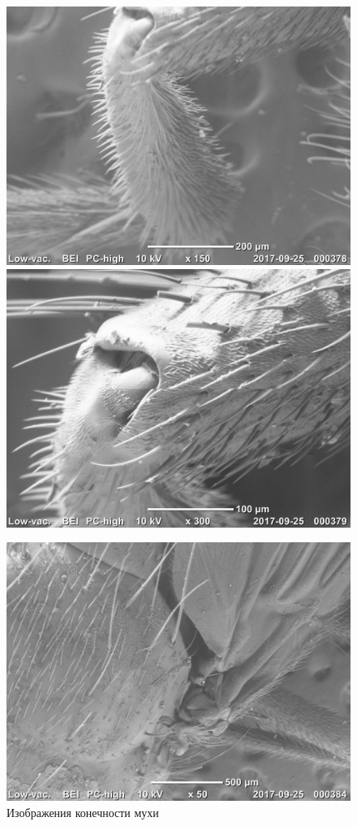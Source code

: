 \documentclass[12pt]{article}
\begin{document}
\begin{figure}
	\includegraphics[scale=0.65]{pictures/20170925_000378.jpg}
	\includegraphics[scale=0.65]{pictures/20170925_000379.jpg}
	\caption{Изображения конечности мухи}
	\vspace{0.2cm}
	\includegraphics[scale=0.65]{pictures/20170925_000384.jpg}

\end{figure}
\end{document}
